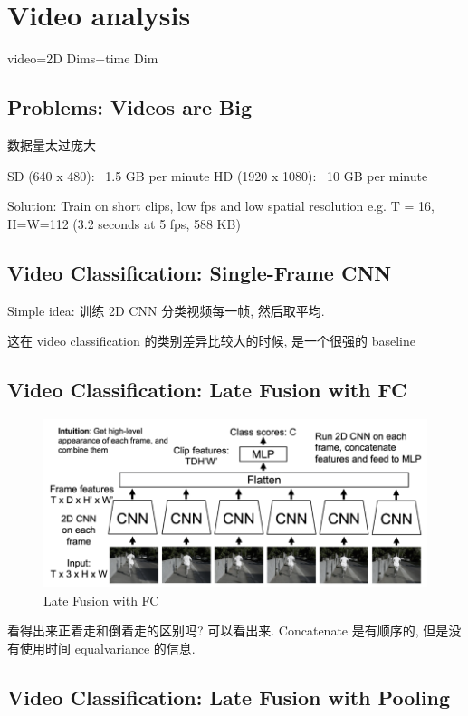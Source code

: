 \section{Video analysis}

video=2D Dims+time Dim

\subsection{Problems: Videos are Big}

数据量太过庞大

SD (640 x 480): ~1.5 GB per minute
HD (1920 x 1080): ~10 GB per minute

Solution: Train on short clips, low fps and low spatial resolution
e.g. T = 16, H=W=112 (3.2 seconds at 5 fps, 588 KB)

\subsection{Video Classification: Single-Frame CNN}

Simple idea: 训练 2D CNN 分类视频每一帧, 然后取平均.

这在 video classification 的类别差异比较大的时候, 是一个很强的 baseline

\subsection{Video Classification: Late Fusion with FC}

\begin{figure}[htbp]
    \centering
    \includegraphics[scale=0.25]{figures/LF_FC.png}
    \caption{Late Fusion with FC}
\end{figure}

看得出来正着走和倒着走的区别吗? 可以看出来. Concatenate 是有顺序的, 但是没有使用时间 equalvariance 的信息.

\subsection{Video Classification: Late Fusion with Pooling}

